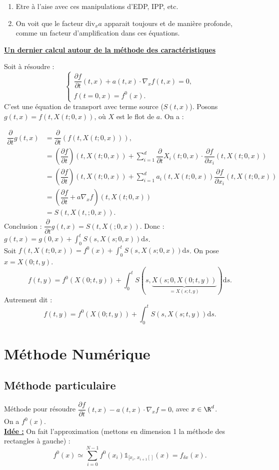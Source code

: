 \documentclass[12pt,a4paper]{article}
\newcommand\diff[2]{\dfrac{\partial #1}{\partial #2}}
\begin{document}
	\begin{enumerate}[label=\textbullet]
		\item Etre à l'aise avec ces manipulations d'EDP, IPP, etc.
		\item On voit que le facteur $\mathrm{div}_x a$ apparait toujours et de manière profonde, comme un facteur d'amplification dans ces équations.
	\end{enumerate}
	
	
	\textbf{\underline{Un dernier calcul autour de la méthode des caractéristiques}}
	
	Soit à résoudre :
	\[
	\begin{cases}
		\diff{f}{t}(t,x) + a(t,x) \cdot \nabla_x f(t,x) = 0,\\
		f(t=0,x) = f^0(x).
	\end{cases}
	\]
	C'est une équation de transport avec terme source ($S(t,x)$). Posons $g(t,x)= f(t,X(t;0,x))$, où $X$ est le flot de $a$. On a :
	
	\[
	\begin{aligned}
		\diff{}t g(t,x) &= \diff{}t \left(f(t,X(t;0,x))\right),\\
		&= \left(\diff ft\right)(t,X(t;0,x))+\sum_{i=1}^d \diff{}t X_i(t;0,x) \cdot\diff f{x_i}(t,X(t;0,x))\\
		&= \left(\diff ft\right)(t,X(t;0,x)) + \sum_{i=1}^d a_i(t,X(t;0,x))\diff f{x_i}(t,X(t;0,x))\\
		&= \left(\diff ft + a\nabla_x f\right)(t,X(t;0,x))\\
		&= S(t,X(t,;0,x)).
	\end{aligned}
	\]
	Conclusion : $\diff{}t g(t,x) = S(t,X(;0,x))$. Donc : $g(t,x) = g(0,x) + \displaystyle\int_0^t S(s,X(s;0,x))\mathrm ds$.\\
	Soit $f(t,X(t;0,x)) = f^0(x) + \displaystyle\int_0^t S(s,X(s;0,x))\mathrm ds$. On pose $x = X(0;t,y)$.
	\[
	f(t,y) = f^0(X(0;t,y)) + \int_0^t S(s,\underbrace{X(s;0,X(0;t,y))}_{=X(s;t,y)})\mathrm ds.
	\]
	Autrement dit :
	\[
	f(t,y) = f^0(X(0;t,y)) + \int_0^t S(s,X(s;t,y))\mathrm ds.
	\]
	
	\section{Méthode Numérique}
	
	\subsection{Méthode particulaire}
	
	Méthode pour résoudre $\diff ft(t,x) - a(t,x) \cdot\nabla_x f = 0$, avec $x \in \R^d$.\\
	On a $f^0(x)$.\\
	\large{\textbf{\underline{Idée :}}} On fait l'approximation (mettons en dimension 1 la méthode des rectangles à gauche) : 
	\[
		f^0(x) \simeq \displaystyle\sum_{i=0}^{N-1} f^0(x_i)\mathbb{1}_{[x_i,\,x_{i+1}[]}(x) = f_{\delta x}(x).
	\]
	
\end{document}
